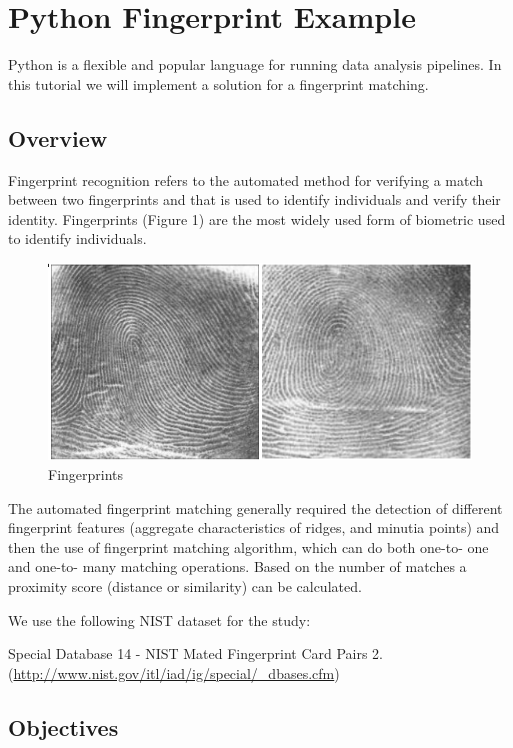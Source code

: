 \section{Python Fingerprint Example}\label{python-fingerprint-example}

Python is a flexible and popular language for running data analysis
pipelines. In this tutorial we will implement a solution for a
fingerprint matching.

\subsection{Overview}\label{overview}

Fingerprint recognition refers to the automated method for verifying a
match between two fingerprints and that is used to identify individuals
and verify their identity. Fingerprints (Figure 1) are the most widely
used form of biometric used to identify individuals.

\begin{figure}
\centering
\includegraphics{./fingerprints.png}
\caption{Fingerprints}
\end{figure}

The automated fingerprint matching generally required the detection of
different fingerprint features (aggregate characteristics of ridges, and
minutia points) and then the use of fingerprint matching algorithm,
which can do both one-to- one and one-to- many matching operations.
Based on the number of matches a proximity score (distance or
similarity) can be calculated.

We use the following NIST dataset for the study:

Special Database 14 - NIST Mated Fingerprint Card Pairs 2.
(\url{http://www.nist.gov/itl/iad/ig/special/_dbases.cfm})

\subsection{Objectives}\label{objectives}

